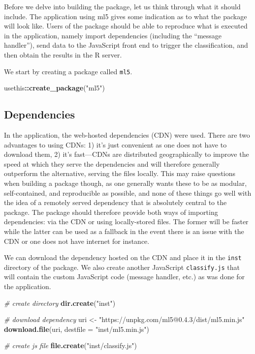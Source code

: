 \documentclass[10pt,]{krantz}
\makeatletter
\newenvironment{Shaded}{\begin{snugshade}}{\end{snugshade}}
\newcommand{\CommentTok}[1]{\textcolor[rgb]{0.37,0.37,0.37}{\textit{#1}}}
\newcommand{\DataTypeTok}[1]{\textcolor[rgb]{0.27,0.27,0.27}{#1}}
\newcommand{\KeywordTok}[1]{\textcolor[rgb]{0.27,0.27,0.27}{\textbf{#1}}}
\newcommand{\NormalTok}[1]{#1}
\newcommand{\OperatorTok}[1]{\textcolor[rgb]{0.43,0.43,0.43}{\textbf{#1}}}
\newcommand{\StringTok}[1]{\textcolor[rgb]{0.5,0.5,0.5}{#1}}
\newenvironment{kframe}{%
\medskip{}
\setlength{\fboxsep}{.8em}
 \def\at@end@of@kframe{}%
 \ifinner\ifhmode%
  \def\at@end@of@kframe{\end{minipage}}%
  \begin{minipage}{\columnwidth}%
 \fi\fi%
 \def\FrameCommand##1{\hskip\@totalleftmargin \hskip-\fboxsep
 \colorbox{shadecolor}{##1}\hskip-\fboxsep
     \hskip-\linewidth \hskip-\@totalleftmargin \hskip\columnwidth}%
 \MakeFramed {\advance\hsize-\width
   \@totalleftmargin\z@ \linewidth\hsize
   \@setminipage}}%
 {\par\unskip\endMakeFramed%
 \at@end@of@kframe}
\renewenvironment{Shaded}{\begin{kframe}}{\end{kframe}}
\makeatother
\begin{document}
Before we delve into building the package, let us think through what it should include. The application using ml5 gives some indication as to what the package will look like. Users of the package should be able to reproduce what is executed in the application, namely import dependencies (including the ``message handler''), send data to the JavaScript front end to trigger the classification, and then obtain the results in the R server.

We start by creating a package called \texttt{ml5}.

\begin{Shaded}
\begin{Highlighting}[]
\NormalTok{usethis}\OperatorTok{::}\KeywordTok{create_package}\NormalTok{(}\StringTok{"ml5"}\NormalTok{)}
\end{Highlighting}
\end{Shaded}

\hypertarget{shiny-complete-pkg-deps}{%
\subsection{Dependencies}\label{shiny-complete-pkg-deps}}

In the application, the web-hosted dependencies (CDN) were used. There are two advantages to using CDNs: 1) it's just convenient as one does not have to download them, 2) it's fast---CDNs are distributed geographically to improve the speed at which they serve the dependencies and will therefore generally outperform the alternative, serving the files locally. This may raise questions when building a package though, as one generally wants these to be as modular, self-contained, and reproducible as possible, and none of these things go well with the idea of a remotely served dependency that is absolutely central to the package. The package should therefore provide both ways of importing dependencies: via the CDN or using locally-stored files. The former will be faster while the latter can be used as a fallback in the event there is an issue with the CDN or one does not have internet for instance.

We can download the dependency hosted on the CDN and place it in the \texttt{inst} directory of the package. We also create another JavaScript \texttt{classify.js} that will contain the custom JavaScript code (message handler, etc.) as was done for the application.

\begin{Shaded}
\begin{Highlighting}[]
\CommentTok{# create directory}
\KeywordTok{dir.create}\NormalTok{(}\StringTok{"inst"}\NormalTok{)}

\CommentTok{# download dependency}
\NormalTok{uri <-}\StringTok{ "https://unpkg.com/ml5@0.4.3/dist/ml5.min.js"}
\KeywordTok{download.file}\NormalTok{(uri, }\DataTypeTok{destfile =} \StringTok{"inst/ml5.min.js"}\NormalTok{)}

\CommentTok{# create js file }
\KeywordTok{file.create}\NormalTok{(}\StringTok{"inst/classify.js"}\NormalTok{)}
\end{Highlighting}
\end{Shaded}
\end{document}
